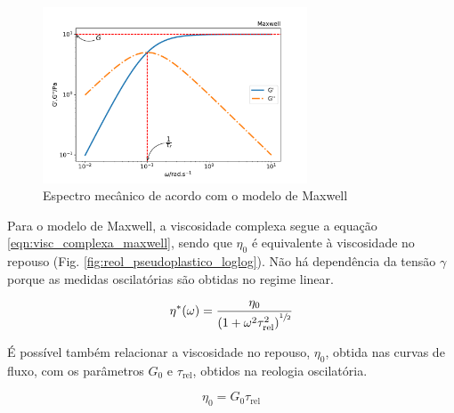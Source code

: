 			\begin{figure}[h]
				\centering
				\includegraphics[width=0.7\textwidth]{./imagens/reologia/modelo_maxwell}
				\caption{Espectro mecânico de acordo com o modelo de Maxwell}
				\label{fig:modelo_maxwell}
			\end{figure} 
			
			Para o modelo de Maxwell, a viscosidade complexa segue a equação \ref{eqn:visc_complexa_maxwell}, sendo que \(\eta_0\) é equivalente à viscosidade no repouso (Fig. \ref{fig:reol_pseudoplastico_loglog}). Não há dependência da tensão \(\gamma\) porque as medidas oscilatórias são obtidas no regime linear. %
			
			\begin{equation}
				 \eta^* (\omega) = \dfrac{\eta_0}{\left( 1 + \omega^2 \tau_\mathrm{rel}^2 \right)^{\sfrac{1}{2}}}
				\label{eqn:visc_complexa_maxwell}
			\end{equation} 
			
			É possível também relacionar a viscosidade no repouso, \(\eta_0\), obtida nas curvas de fluxo, com os parâmetros \(G_0\) e \(\tau_{\mathrm{rel}}\), obtidos na reologia oscilatória. 
			
			\begin{equation}
				\eta_0 = G_0 \tau_{\mathrm{rel}}
				\label{eqn:eta0_g0_taurel}
			\end{equation}  %
			
			
